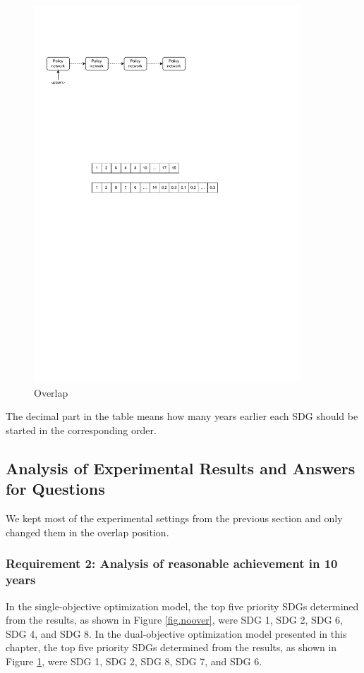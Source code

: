 \documentclass[10pt]{mcmthesis}
\begin{document}
\begin{figure}[H]
    \centering
    \includegraphics[width=10.0cm]{figures/Overlap figure.pdf}
    \caption{ Overlap }%
    \label{fig.over}
\end{figure} 
\vspace{-15pt}

The decimal part in the table means how many years earlier each SDG should be started in the corresponding order.

\subsection{Analysis of Experimental Results and Answers for Questions}%
We kept most of the experimental settings from the previous section and only changed them in the overlap position.%

\subsubsection{Requirement 2: Analysis of reasonable achievement in 10 years}


In the single-objective optimization model, the top five priority SDGs determined from the results, as shown in Figure \ref{fig.noover}, were SDG 1, SDG 2, SDG 6, SDG 4, and SDG 8. In the dual-objective optimization model presented in this chapter, the top five priority SDGs determined from the results, as shown in Figure \ref{fig.over}, were SDG 1, SDG 2, SDG 8, SDG 7, and SDG 6.
\end{document}
